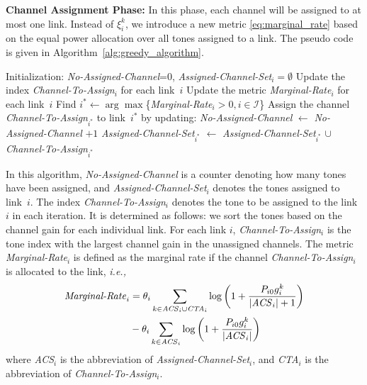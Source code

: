 \documentclass[conference]{IEEEtran}
\newcommand{\ie}{\emph{i.e., }}
\newcommand{\mi}{\mathcal{I}}
\begin{document}
{\bf Channel Assignment Phase:} In this phase, each channel will be assigned to at most one link. Instead of $\xi_{i}^k$, we introduce a new metric \eqref{eq:marginal_rate} based on the equal power allocation over all tones assigned to a link. The pseudo code is given in Algorithm~\ref{alg:greedy_algorithm}.
\begin{algorithm}[htb]
\caption{Channel Assignment for SOA}
\label{alg:greedy_algorithm}
\begin{algorithmic}[1]
\State Initialization: \emph{No-Assigned-Channel}=0,
\Statex \quad\quad\quad\quad\quad\;\;\emph{Assigned-Channel-Set}$_i=\emptyset$
	\State Update the index \emph{Channel-To-Assign}$_i$ for each link~$i$
	\State Update the metric \emph{Marginal-Rate}$_i$ for each link~$i$
	\State Find $i^*\gets \arg\max $\{\emph{Marginal-Rate}$_i>0,i\in\mi$\}
	\State Assign the channel \emph{Channel-To-Assign}$_{i^*}$ to link~$i^*$ by updating:
   \Statex \quad\quad\;\;\emph{No-Assigned-Channel} $\gets$ \emph{No-Assigned-Channel} $+1$
	\Statex \quad\quad\; \emph{Assigned-Channel-Set}$_{i^*}$ $\gets$ \emph{Assigned-Channel-Set}$_{i^*}$ $\cup$ \emph{Channel-To-Assign}$_{i^*}$
\EndWhile
\end{algorithmic}
\end{algorithm}
In this algorithm, \emph{No-Assigned-Channel} is a counter denoting how many tones have been assigned, and \emph{Assigned-Channel-Set}$_i$ denotes the tones assigned to link~$i$. The index \emph{Channel-To-Assign}$_i$ denotes the tone to be assigned to the link~$i$ in each iteration. It is determined as follows: we sort the tones based on the
channel gain for each individual link. For each link $i$, \emph{Channel-To-Assign}$_i$ is the tone index with the largest channel gain in  the unassigned channels. The metric \emph{Marginal-Rate}$_i$ is defined as the marginal rate if the channel \emph{Channel-To-Assign}$_i$ is allocated to the link, \ie
\begin{align}
\label{eq:marginal_rate}
\text{\emph{Marginal-Rate}}_i&=\theta_i\sum_{k\in\text{\emph{ACS}}_i\cup \text{\emph{CTA}}_i}\log\left(1+\frac{P_{i0}g_{i}^k}{|\text{\emph{ACS}}_i|+1}\right) \nonumber\\
&-\theta_i\sum_{k\in\text{\emph{ACS}}_i}\log\left(1+\frac{P_{i0}g_{i}^k}{|\text{\emph{ACS}}_i|}\right)
\end{align}
where \emph{ACS}$_i$ is the abbreviation of \emph{Assigned-Channel-Set}$_i$, and \emph{CTA}$_i$ is the abbreviation of  \emph{Channel-To-Assign}$_i$.
\end{document}
